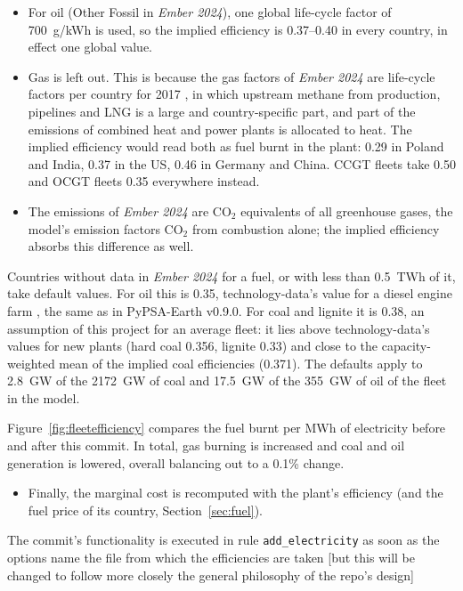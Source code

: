 \begin{itemize}[nosep,leftmargin=*]
  \item For oil (Other Fossil in \textit{Ember 2024}), one global life-cycle factor of \SI{700}{g/kWh} \citep{ipcc2014annex3} is used, so the implied efficiency is 0.37--0.40 in every country, in effect one global value.
  \item Gas is left out.
  This is because the gas factors of \textit{Ember 2024} are life-cycle factors per country for 2017 \citep{jordaan2022}, in which upstream methane from production, pipelines and LNG is a large and country-specific part, and part of the emissions of combined heat and power plants is allocated to heat.
  The implied efficiency would read both as fuel burnt in the plant: 0.29 in Poland and India, 0.37 in the US, 0.46 in Germany and China.
  CCGT fleets take 0.50 and OCGT fleets 0.35 everywhere instead.
  \item The emissions of \textit{Ember 2024} are CO$_2$ equivalents of all greenhouse gases, the model's emission factors CO$_2$ from combustion alone; the implied efficiency absorbs this difference as well.
\end{itemize}

Countries without data in \textit{Ember 2024} for a fuel, or with less than \SI{0.5}{TWh} of it, take default values.
For oil this is 0.35, technology-data's value for a diesel engine farm \citep{techdata}, the same as in PyPSA-Earth v0.9.0.
For coal and lignite it is 0.38, an assumption of this project for an average fleet: it lies above technology-data's values for new plants (hard coal 0.356, lignite 0.33) and close to the capacity-weighted mean of the implied coal efficiencies (0.371).
The defaults apply to \SI{2.8}{GW} of the \SI{2172}{GW} of coal and \SI{17.5}{GW} of the \SI{355}{GW} of oil of the fleet in the model.

Figure~\ref{fig:fleetefficiency} compares the fuel burnt per MWh of electricity before and after this commit.
In total, gas burning is increased and coal and oil generation is lowered, overall balancing out to a 0.1\% change.

\begin{itemize}[nosep,leftmargin=*]
  \item Finally, the marginal cost is recomputed with the plant's efficiency (and the fuel price of its country, Section~\ref{sec:fuel}).
\end{itemize}

The commit's functionality is executed in rule \texttt{add\_electricity} as soon as the options name the file from which the efficiencies are taken [but this will be changed to follow more closely the general philosophy of the repo's design]

